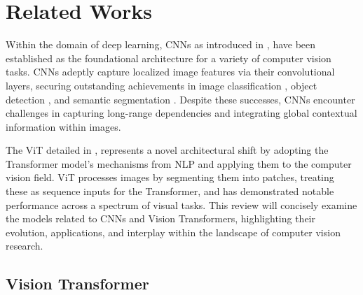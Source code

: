 \section{Related Works}
\label{sec2}


Within the domain of deep learning, CNNs as introduced in \cite{krizhevsky2017imagenet}, 
have been established as the foundational architecture for a variety of computer vision tasks. 
CNNs adeptly capture localized image features via their convolutional layers, 
securing outstanding achievements in image classification \cite{lecun1989backpropagation}, 
object detection \cite{faster2015towards}, and semantic segmentation \cite{long2015fully}. 
Despite these successes, CNNs encounter challenges in capturing long-range dependencies and integrating global contextual information within images.

The ViT detailed in \cite{dosovitskiy2020image}, represents a novel architectural shift by adopting the Transformer model's \cite{vaswani2017attention} mechanisms 
from NLP and applying them to the computer vision field. 
ViT processes images by segmenting them into patches, treating these as sequence inputs for the Transformer, 
and has demonstrated notable performance across a spectrum of visual tasks. 
This review will concisely examine the models related to CNNs and Vision Transformers, highlighting their evolution, applications, 
and interplay within the landscape of computer vision research.

\subsection{Vision Transformer}
\label{subsec:vit}

